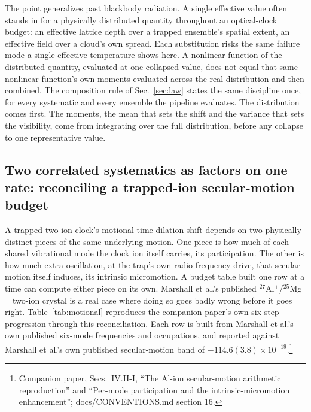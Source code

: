 \documentclass[aps,pra,superscriptaddress,groupedaddress,nofootinbib]{revtex4-2}
\begin{document}
The point generalizes past blackbody radiation. A single effective
value often stands in for a physically distributed quantity
throughout an optical-clock budget: an effective lattice depth over a
trapped ensemble's spatial extent, an effective field over a cloud's
own spread. Each substitution risks the same failure mode a single
effective temperature shows here. A nonlinear function of the
distributed quantity, evaluated at one collapsed value, does not
equal that same nonlinear function's own moments evaluated across the
real distribution and then combined. The composition rule of
Sec.~\ref{sec:law} states the same discipline once, for every
systematic and every ensemble the pipeline evaluates. The
distribution comes first. The moments, the mean that sets the
shift and the variance that sets the visibility, come from
integrating over the full distribution, before any collapse to one
representative value.

\subsection{Two correlated systematics as factors on one rate: reconciling a trapped-ion secular-motion budget}
\label{sec:motional}

A trapped two-ion clock's motional time-dilation shift depends on two
physically distinct pieces of the same underlying motion. One piece
is how much of each shared vibrational mode the clock ion itself
carries, its participation. The other is how much extra oscillation,
at the trap's own radio-frequency drive, that secular motion itself
induces, its intrinsic micromotion. A budget table built one row at a
time can compute either piece on its own. Marshall et al.'s published
$^{27}$Al$^+$/$^{25}$Mg$^+$ two-ion crystal is a real case where doing
so goes badly wrong before it goes right. Table~\ref{tab:motional}
reproduces the companion paper's own six-step progression through this
reconciliation. Each row is built from Marshall et al.'s own
published six-mode frequencies and occupations, and reported against
Marshall et al.'s own published secular-motion band of
$-114.6(3.8)\times10^{-19}$.\footnote{Companion paper,
Secs.~IV.H-I, ``The Al-ion secular-motion arithmetic reproduction''
and ``Per-mode participation and the intrinsic-micromotion
enhancement''; docs/CONVENTIONS.md section 16.}
\end{document}
